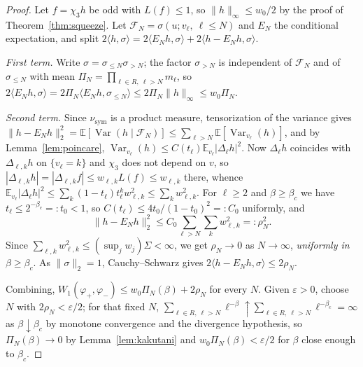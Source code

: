 \documentclass[11pt]{amsart}
\numberwithin{equation}{section}
\theoremstyle{definition}
\theoremstyle{remark}
\newcommand{\Var}{\operatorname{Var}}
\newcommand{\nusym}{\nu_{\mathrm{sym}}}
\begin{document}
\begin{proof}
Let $f=\chi_3h$ be odd with $L(f)\le1$, so $\|h\|_\infty\le w_0/2$ by the proof of
Theorem~\ref{thm:squeeze}. Let $\mathcal F_N=\sigma(u;v_\ell,\ \ell\le N)$ and $E_N$ the
conditional expectation, and split
$2\langle h,\sigma\rangle=2\langle E_Nh,\sigma\rangle+2\langle h-E_Nh,\sigma\rangle$.

\emph{First term.} Write $\sigma=\sigma_{\le N}\sigma_{>N}$; the factor $\sigma_{>N}$ is
independent of $\mathcal F_N$ and of $\sigma_{\le N}$ with mean
$\Pi_N=\prod_{\ell\in R,\ \ell>N}m_\ell$, so
$2\langle E_Nh,\sigma\rangle=2\Pi_N\langle E_Nh,\sigma_{\le N}\rangle\le2\Pi_N\|h\|_\infty\le w_0\Pi_N$.

\emph{Second term.} Since $\nusym$ is a product measure, tensorization of the variance gives
$\|h-E_Nh\|_2^2=\mathbb E[\Var(h\mid\mathcal F_N)]\le\sum_{\ell>N}\mathbb E[\Var_{v_\ell}(h)]$,
and by Lemma~\ref{lem:poincare},
$\Var_{v_\ell}(h)\le C(t_\ell)\mathbb E_{v_\ell}|\Delta_\ell h|^2$. Now $\Delta_\ell h$
coincides with $\Delta_{\ell,k}h$ on $\{v_\ell=k\}$ and $\chi_3$ does not depend on $v$, so
$|\Delta_{\ell,k}h|=|\Delta_{\ell,k}f|\le w_{\ell,k}L(f)\le w_{\ell,k}$ there, whence
$\mathbb E_{v_\ell}|\Delta_\ell h|^2\le\sum_k(1-t_\ell)t_\ell^kw_{\ell,k}^2\le\sum_kw_{\ell,k}^2$.
For $\ell\ge2$ and $\beta\ge\beta_c$ we have $t_\ell\le2^{-\beta_c}=:t_0<1$, so
$C(t_\ell)\le4t_0/(1-t_0)^2=:C_0$ uniformly, and
\[
\|h-E_Nh\|_2^2\le C_0\sum_{\ell>N}\sum_{k}w_{\ell,k}^2=:\rho_N^2 .
\]
Since $\sum_{\ell,k}w_{\ell,k}^2\le(\sup_jw_j)\Sigma<\infty$, we get $\rho_N\to0$ as
$N\to\infty$, \emph{uniformly in $\beta\ge\beta_c$}. As $\|\sigma\|_2=1$, Cauchy--Schwarz
gives $2\langle h-E_Nh,\sigma\rangle\le2\rho_N$.

Combining, $W_1(\varphi_+,\varphi_-)\le w_0\Pi_N(\beta)+2\rho_N$ for every $N$. Given
$\varepsilon>0$, choose $N$ with $2\rho_N<\varepsilon/2$; for that fixed $N$,
$\sum_{\ell\in R,\ \ell>N}\ell^{-\beta}\uparrow\sum_{\ell\in R,\ \ell>N}\ell^{-\beta_c}=\infty$
as $\beta\downarrow\beta_c$ by monotone convergence and the divergence hypothesis, so
$\Pi_N(\beta)\to0$ by Lemma~\ref{lem:kakutani} and $w_0\Pi_N(\beta)<\varepsilon/2$ for
$\beta$ close enough to $\beta_c$.
\end{proof}
\end{document}
